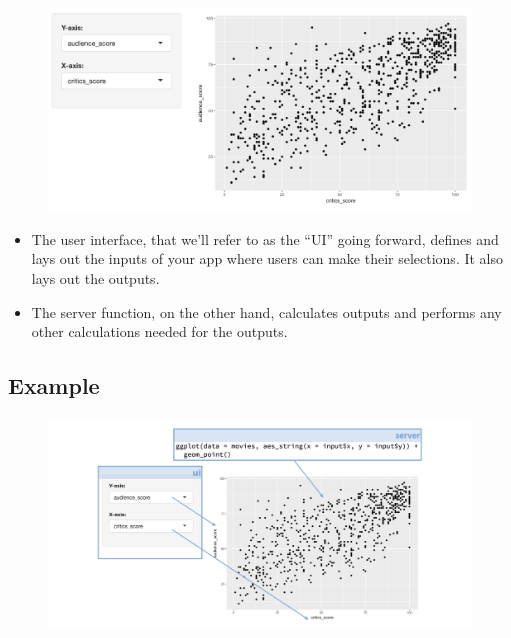 \documentclass[
  letterpaper,
  DIV=11,
  numbers=noendperiod]{scrreprt}
\begin{document}
\begin{figure}

{\centering \includegraphics[width=1\textwidth,height=\textheight]{./images/app-selectinput-scatterplot.png}

}

\end{figure}

\begin{itemize}
\item
  The user interface, that we'll refer to as the ``UI'' going forward,
  defines and lays out the inputs of your app where users can make their
  selections. It also lays out the outputs.
\item
  The server function, on the other hand, calculates outputs and
  performs any other calculations needed for the outputs.
\end{itemize}

\hypertarget{example}{%
\subsection{Example}\label{example}}

\begin{figure}

{\centering \includegraphics[width=1\textwidth,height=\textheight]{./images/ui-to-scatterplot.png}

}

\end{figure}
\end{document}
